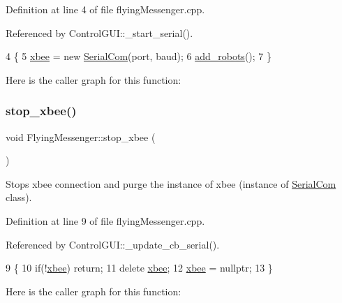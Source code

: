 Definition at line 4 of file flying\+Messenger.\+cpp.



Referenced by Control\+G\+U\+I\+::\+\_\+start\+\_\+serial().


\begin{DoxyCode}
4                                                                 \{
5     \hyperlink{class_flying_messenger_a419820a45ea2bc496c10bf36b7b49033}{xbee} = \textcolor{keyword}{new} \hyperlink{class_serial_com}{SerialCom}(port, baud);
6     \hyperlink{class_flying_messenger_ab3f9bc145db951d2fd7629d04d32febc}{add\_robots}();
7 \}
\end{DoxyCode}
Here is the caller graph for this function\+:
\mbox{\label{class_flying_messenger_ab9ed5a0b43196b5771a469c03f213856}} 
\subsubsection{\texorpdfstring{stop\+\_\+xbee()}{stop\_xbee()}}
{\footnotesize\ttfamily void Flying\+Messenger\+::stop\+\_\+xbee (\begin{DoxyParamCaption}{ }\end{DoxyParamCaption})}



Stops xbee connection and purge the instance of xbee (instance of \hyperlink{class_serial_com}{Serial\+Com} class). 



Definition at line 9 of file flying\+Messenger.\+cpp.



Referenced by Control\+G\+U\+I\+::\+\_\+update\+\_\+cb\+\_\+serial().


\begin{DoxyCode}
9                                 \{
10     \textcolor{keywordflow}{if}(!\hyperlink{class_flying_messenger_a419820a45ea2bc496c10bf36b7b49033}{xbee}) \textcolor{keywordflow}{return};
11     \textcolor{keyword}{delete} \hyperlink{class_flying_messenger_a419820a45ea2bc496c10bf36b7b49033}{xbee};
12     \hyperlink{class_flying_messenger_a419820a45ea2bc496c10bf36b7b49033}{xbee} = \textcolor{keyword}{nullptr};
13 \}
\end{DoxyCode}
Here is the caller graph for this function\+:
\mbox{\label{class_flying_messenger_a0bcca6b75e89b91681685da9f7bc54f1}} 
